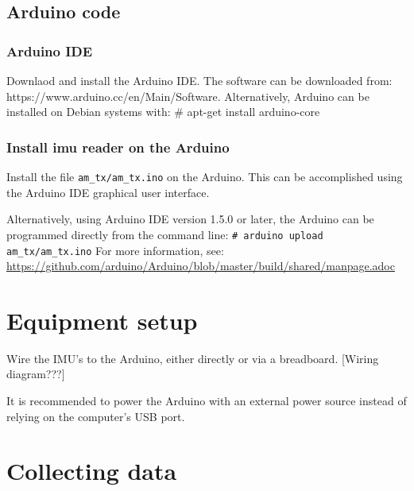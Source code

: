 \documentclass[11pt,letterpaper,article]{memoir}
\newcommand{\name}{imu reader}
\begin{document}
\subsection{Arduino code}

\subsubsection{Arduino IDE}
Downlaod and install the Arduino IDE.
The software can be downloaded from:
https://www.arduino.cc/en/Main/Software.
Alternatively, Arduino can be installed on Debian systems with:
\# apt-get install arduino-core

\subsubsection{Install \name{} on the Arduino}
\label{sec:installarduinocode}

Install the file \texttt{am\_tx/am\_tx.ino} on the Arduino.
This can be accomplished using the Arduino IDE graphical user interface.

Alternatively, using Arduino IDE version 1.5.0 or later,
the Arduino can be programmed directly from the command line:
\texttt{\# arduino upload am\_tx/am\_tx.ino}
For more information, see:
\href{https://github.com/arduino/Arduino/blob/master/build/shared/manpage.adoc}
{https://github.com/arduino/Arduino/blob/master/build/shared/manpage.adoc}

\section{Equipment setup}

Wire the IMU's to the Arduino, either directly or via a breadboard. [Wiring diagram???]

It is recommended to power the Arduino with an external power source instead of relying on the computer's USB port.

\section{Collecting data}
\end{document}
